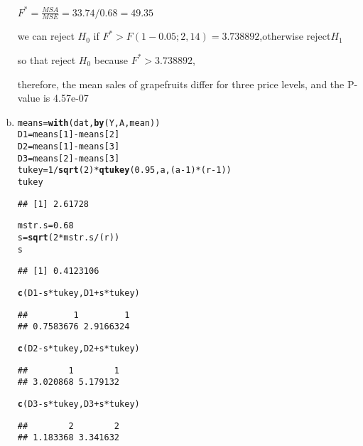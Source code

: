 \documentclass{article}\usepackage[]{graphicx}\usepackage[]{color}
\makeatletter
\newcommand{\hlnum}[1]{\textcolor[rgb]{0.686,0.059,0.569}{#1}}%
\newcommand{\hlopt}[1]{\textcolor[rgb]{0,0,0}{#1}}%
\newcommand{\hlstd}[1]{\textcolor[rgb]{0.345,0.345,0.345}{#1}}%
\newcommand{\hlkwb}[1]{\textcolor[rgb]{0.69,0.353,0.396}{#1}}%
\newcommand{\hlkwd}[1]{\textcolor[rgb]{0.737,0.353,0.396}{\textbf{#1}}}%
\newenvironment{kframe}{%
 \def\at@end@of@kframe{}%
 \ifinner\ifhmode%
  \def\at@end@of@kframe{\end{minipage}}%
  \begin{minipage}{\columnwidth}%
 \fi\fi%
 \def\FrameCommand##1{\hskip\@totalleftmargin \hskip-\fboxsep
 \colorbox{shadecolor}{##1}\hskip-\fboxsep
     \hskip-\linewidth \hskip-\@totalleftmargin \hskip\columnwidth}%
 \MakeFramed {\advance\hsize-\width
   \@totalleftmargin\z@ \linewidth\hsize
   \@setminipage}}%
 {\par\unskip\endMakeFramed%
 \at@end@of@kframe}
\newenvironment{knitrout}{}{} %
\makeatother
\begin{document}
\begin{enumerate}[(a)]
\begin{center}
$F^*=\frac{MSA}{MSE} = 33.74/0.68   = 49.35$

we can reject $H_0$ if $F^* > F(1-0.05;2,14)=3.738892$,otherwise reject$H_1$

so that reject $H_0$ because $F^*>3.738892$,

therefore, the mean sales of grapefruits differ for three price levels, and the P-value is 4.57e-07
\end{center}

\item

\begin{knitrout}
\color{fgcolor}\begin{kframe}
\begin{alltt}
  \hlstd{means} \hlkwb{=} \hlkwd{with}\hlstd{(dat,} \hlkwd{by}\hlstd{(Y, A, mean))}
  \hlstd{D1} \hlkwb{=} \hlstd{means[}\hlnum{1}\hlstd{]} \hlopt{-} \hlstd{means[}\hlnum{2}\hlstd{]}
  \hlstd{D2} \hlkwb{=} \hlstd{means[}\hlnum{1}\hlstd{]} \hlopt{-} \hlstd{means[}\hlnum{3}\hlstd{]}
  \hlstd{D3} \hlkwb{=} \hlstd{means[}\hlnum{2}\hlstd{]} \hlopt{-} \hlstd{means[}\hlnum{3}\hlstd{]}
  \hlstd{tukey} \hlkwb{=} \hlnum{1}\hlopt{/}\hlkwd{sqrt}\hlstd{(}\hlnum{2}\hlstd{)}\hlopt{*}\hlkwd{qtukey}\hlstd{(}\hlnum{0.95}\hlstd{, a, (a}\hlopt{-}\hlnum{1}\hlstd{)}\hlopt{*}\hlstd{(r}\hlopt{-}\hlnum{1}\hlstd{))}
  \hlstd{tukey}
\end{alltt}
\begin{verbatim}
## [1] 2.61728
\end{verbatim}
\begin{alltt}
  \hlstd{mstr.s} \hlkwb{=} \hlnum{0.68}
  \hlstd{s} \hlkwb{=} \hlkwd{sqrt}\hlstd{(}\hlnum{2}\hlopt{*}\hlstd{mstr.s}\hlopt{/}\hlstd{(r))}
  \hlstd{s}
\end{alltt}
\begin{verbatim}
## [1] 0.4123106
\end{verbatim}
\begin{alltt}
  \hlkwd{c}\hlstd{(D1}\hlopt{-}\hlstd{s}\hlopt{*}\hlstd{tukey, D1}\hlopt{+}\hlstd{s}\hlopt{*}\hlstd{tukey)}
\end{alltt}
\begin{verbatim}
##         1         1 
## 0.7583676 2.9166324
\end{verbatim}
\begin{alltt}
  \hlkwd{c}\hlstd{(D2}\hlopt{-}\hlstd{s}\hlopt{*}\hlstd{tukey, D2}\hlopt{+}\hlstd{s}\hlopt{*}\hlstd{tukey)}
\end{alltt}
\begin{verbatim}
##        1        1 
## 3.020868 5.179132
\end{verbatim}
\begin{alltt}
  \hlkwd{c}\hlstd{(D3}\hlopt{-}\hlstd{s}\hlopt{*}\hlstd{tukey, D3}\hlopt{+}\hlstd{s}\hlopt{*}\hlstd{tukey)}
\end{alltt}
\begin{verbatim}
##        2        2 
## 1.183368 3.341632
\end{verbatim}
\end{kframe}
\end{knitrout}


\end{enumerate}
\end{document}
